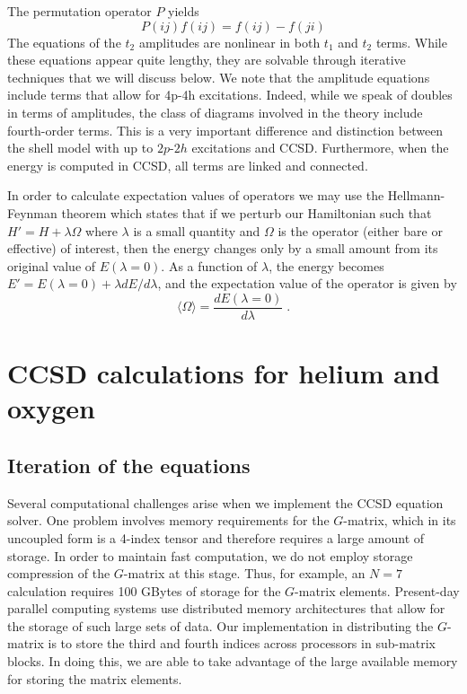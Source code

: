 \documentclass[aps,prc,twocolumn,floatfix]{revtex4}
\begin{document}
The permutation operator $P$ yields
\begin{equation}
P(ij)f(ij) = f(ij) - f(ji)
\end{equation}
The equations of the $t_2$ amplitudes are nonlinear in both $t_1$ and
$t_2$ terms. While these equations appear quite lengthy, they are 
solvable through iterative techniques that we will discuss below. 
We note that the amplitude equations include terms that allow for 
4p-4h excitations. Indeed, while we speak of doubles in terms of 
amplitudes, the class of diagrams involved in the theory include 
fourth-order terms. This is a very important difference 
and distinction between the shell model with up to 
$2p$-$2h$ excitations and CCSD. Furthermore, when
the energy is computed in CCSD, all terms are linked and connected. 

In order to calculate expectation values of operators we may use the 
Hellmann-Feynman theorem \cite{feynman} which states that if we 
perturb our Hamiltonian such that $H'=H+\lambda \Omega$ where $\lambda$ is a
small quantity and $\Omega$ is the operator (either bare or effective) 
of interest, then the
energy changes only by a small amount from its original value of 
$E(\lambda=0)$.  As a function of $\lambda$, the energy becomes
$E'=E(\lambda=0)+\lambda dE/d\lambda$, 
and the expectation value of the operator is given by 
\begin{equation}
\langle \Omega \rangle =\frac{dE(\lambda=0)}{d\lambda} \;.
\label{helfeyn}
\end{equation}

\section{CCSD calculations for helium and oxygen}
\label{sec:results}

\subsection{Iteration of the equations}

Several computational challenges arise when we implement the CCSD
equation solver. One problem involves memory requirements for the 
$G$-matrix, which in its uncoupled form is a 4-index tensor and 
therefore requires a large amount of storage. In order to maintain
fast computation, we do not employ storage compression of the $G$-matrix
at this stage. Thus, for example, 
an $N=7$ calculation requires 100 GBytes of storage for
the $G$-matrix elements. 
Present-day parallel 
computing systems use distributed memory architectures that allow for
the storage of such large sets of data. Our implementation in distributing
the $G$-matrix is to store the third and fourth indices across processors in
sub-matrix blocks. In doing this, we are able to take advantage of 
the large available memory for storing the matrix elements. 
\end{document}
